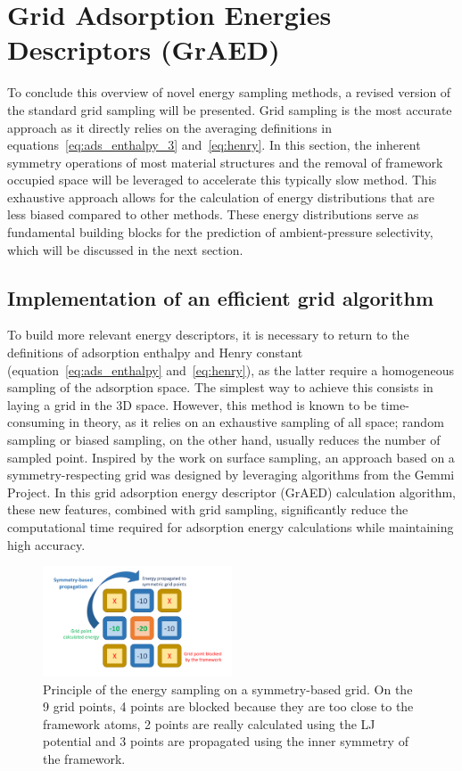 \documentclass[main]{subfiles}
\begin{document}
\section{Grid Adsorption Energies Descriptors (GrAED)}\label{sct:grid}

To conclude this overview of novel energy sampling methods, a revised version of the standard grid sampling will be presented. Grid sampling is the most accurate approach as it directly relies on the averaging definitions in equations~\ref{eq:ads_enthalpy_3} and~\ref{eq:henry}. In this section, the inherent symmetry operations of most material structures and the removal of framework occupied space will be leveraged to accelerate this typically slow method. This exhaustive approach allows for the calculation of energy distributions that are less biased compared to other methods. These energy distributions serve as fundamental building blocks for the prediction of ambient-pressure selectivity, which will be discussed in the next section.

\subsection{Implementation of an efficient grid algorithm}

To build more relevant energy descriptors, it is necessary to return to the definitions of adsorption enthalpy and Henry constant (equation~\ref{eq:ads_enthalpy} and~\ref{eq:henry}), as the latter require a homogeneous sampling of the adsorption space. The simplest way to achieve this consists in laying a grid in the 3D space. However, this method is known to be time-consuming in theory, as it relies on an exhaustive sampling of all space; random sampling or biased sampling, on the other hand, usually reduces the number of sampled point. Inspired by the work on surface sampling, an approach based on a symmetry-respecting grid was designed by leveraging algorithms from the Gemmi Project\autocite{Wojdyr_2022}. In this grid adsorption energy descriptor (GrAED) calculation algorithm, these new features, combined with grid sampling, significantly reduce the computational time required for adsorption energy calculations while maintaining high accuracy.

\begin{figure}[ht]
  \centering
    \includegraphics[width=0.5\textwidth]{figures/3-fastsim/grid_sampling.pdf}
    \caption{Principle of the energy sampling on a symmetry-based grid. On the 9 grid points, 4 points are blocked because they are too close to the framework atoms, 2 points are really calculated using the LJ potential and 3 points are propagated using the inner symmetry of the framework.}\label{fgr:principle_grid}
\end{figure}
\end{document}
